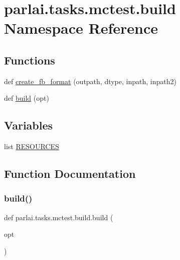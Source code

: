 \hypertarget{namespaceparlai_1_1tasks_1_1mctest_1_1build}{}\section{parlai.\+tasks.\+mctest.\+build Namespace Reference}
\label{namespaceparlai_1_1tasks_1_1mctest_1_1build}
\subsection*{Functions}
\begin{DoxyCompactItemize}
\item 
def \hyperlink{namespaceparlai_1_1tasks_1_1mctest_1_1build_a7d827f19f83b7d60f4ed1dbabade06cf}{create\+\_\+fb\+\_\+format} (outpath, dtype, inpath, inpath2)
\item 
def \hyperlink{namespaceparlai_1_1tasks_1_1mctest_1_1build_aed15e288ff3209606d79f5cbfee86b5a}{build} (opt)
\end{DoxyCompactItemize}
\subsection*{Variables}
\begin{DoxyCompactItemize}
\item 
list \hyperlink{namespaceparlai_1_1tasks_1_1mctest_1_1build_ae23b1fa264022eda3f280b6a5067b009}{R\+E\+S\+O\+U\+R\+C\+ES}
\end{DoxyCompactItemize}


\subsection{Function Documentation}
\mbox{\label{namespaceparlai_1_1tasks_1_1mctest_1_1build_aed15e288ff3209606d79f5cbfee86b5a}} 
\subsubsection{\texorpdfstring{build()}{build()}}
{\footnotesize\ttfamily def parlai.\+tasks.\+mctest.\+build.\+build (\begin{DoxyParamCaption}\item[{}]{opt }\end{DoxyParamCaption})}

